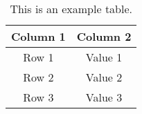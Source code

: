 \begin{table}[htb!]
    \centering
    \begin{tabular}{|c|c|}
        \hline
        \textbf{Column 1} & \textbf{Column 2} \\
        \hline
        Row 1 & Value 1 \\
        Row 2 & Value 2 \\
        Row 3 & Value 3 \\
        \hline
    \end{tabular}
    \caption{This is an example table.}
    \label{tab:example}
\end{table}